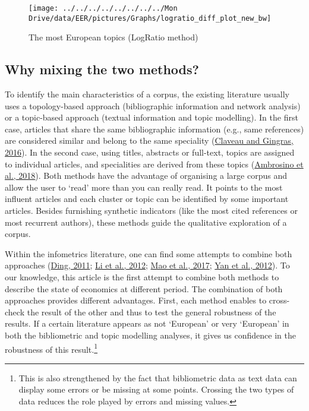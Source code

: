 \documentclass[
  12pt,
  onecolumn]{article}
\begin{document}
\begin{figure}[h]

{\centering \texttt{[image: ../../../../../../../../Mon Drive/data/EER/pictures/Graphs/logratio\_diff\_plot\_new\_bw]} 

}

\caption{The most European topics (LogRatio method)}\label{fig:plot-topic-diff}
\end{figure}

\hypertarget{why-mixing-the-two-methods}{%
\subsection{Why mixing the two
methods?}\label{why-mixing-the-two-methods}}

To identify the main characteristics of a corpus, the existing
literature usually uses a topology-based approach (bibliographic
information and network analysis) or a topic-based approach (textual
information and topic modelling). In the first case, articles that share
the same bibliographic information (e.g., same references) are
considered similar and belong to the same speciality
(\protect\hyperlink{ref-claveau2016}{Claveau and Gingras, 2016}). In the
second case, using titles, abstracts or full-text, topics are assigned
to individual articles, and specialities are derived from these topics
(\protect\hyperlink{ref-ambrosino2018}{Ambrosino et al., 2018}). Both
methods have the advantage of organising a large corpus and allow the
user to `read' more than you can really read. It points to the most
influent articles and each cluster or topic can be identified by some
important articles. Besides furnishing synthetic indicators (like the
most cited references or most recurrent authors), these methods guide
the qualitative exploration of a corpus.

Within the infometrics literature, one can find some attempts to combine
both approaches (\protect\hyperlink{ref-dingCommunity2011}{Ding, 2011};
\protect\hyperlink{ref-liAdding2012}{Li et al., 2012};
\protect\hyperlink{ref-maoTopic2017}{Mao et al., 2017};
\protect\hyperlink{ref-yanTopics2012}{Yan et al., 2012}). To our
knowledge, this article is the first attempt to combine both methods to
describe the state of economics at different period. The combination of
both approaches provides different advantages. First, each method
enables to cross-check the result of the other and thus to test the
general robustness of the results. If a certain literature appears as
not `European' or very `European' in both the bibliometric and topic
modelling analyses, it gives us confidence in the robustness of this
result.\footnote{This is also strengthened by the fact that bibliometric
  data as text data can display some errors or be missing at some
  points. Crossing the two types of data reduces the role played by
  errors and missing values.}
\end{document}
